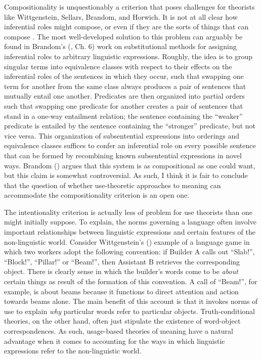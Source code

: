Compositionality is unquestionably a criterion that poses challenges for theorists like Wittgenstein, Sellars, Brandom, and Horwich. It is not at all clear how inferential roles might compose, or even if they are the sorts of things that can compose \citep{FodorLepore:1991}. The most well-developed solution to this problem can arguably be found in Brandom's (\citeyear{Brandom:1994}, Ch. 6) work on substitutional methods for assigning inferential roles to arbitrary linguistic expressions. Roughly, the idea is to group singular terms into equivalence classes with respect to their effects on the inferential roles of the sentences in which they occur, such that swapping one term for another from the same class always produces a pair of sentences that mutually entail one another. Predicates are then organized into partial orders such that swapping one predicate for another creates a pair of sentences that stand in a one-way entailment relation; the sentence containing the ``weaker'' predicate is entailed by the sentence containing the ``stronger'' predicate, but not vice versa. This organization of subsentential expressions into orderings and equivalence classes suffices to confer an inferential role on every possible sentence that can be formed by recombining known subsentential expressions in novel ways. Brandom (\citeyear{Brandom:1994}) argues that this system is as compositional as one could want, but this claim is somewhat controversial. As such, I think it is fair to conclude that the question of whether use-theoretic approaches to meaning can accommodate the compositionality criterion is an open one.

The intentionality criterion is actually less of problem for use theorists than one might initially suppose. To explain, the norms governing a language often involve important relationships between linguistic expressions and certain features of the non-linguistic world. Consider Wittgenstein's (\citeyear{Wittgenstein:1953}) example of a language game in which two workers adopt the following convention: if Builder A calls out ``Slab!'', ``Block!'', ``Pillar!'' or ``Beam!'', then Assistant B retrieves the corresponding object. There is clearly sense in which the builder's words come to be \textit{about} certain things as result of the formation of this convention. A call of ``Beam!'', for example, is about beams because it functions to direct attention and action towards beams alone. The main benefit of this account is that it invokes norms of use to explain \textit{why} particular words refer to particular objects. Truth-conditional theories, on the other hand, often just stipulate the existence of word-object correspondences. As such, usage-based theories of meaning have a natural advantage when it comes to accounting for the ways in which linguistic expressions refer to the non-linguistic world. 

